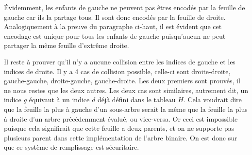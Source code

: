 \documentclass{article}
\begin{document}
Évidemment, les enfants de gauche ne peuvent pas êtres encodés par la feuille de gauche car ils la partage tous. Il sont donc encodés par la feuille de droite. Analogiquement à la preuve du paragraphe ci-haut, il est évident que cet encodage est unique pour tous les enfants de gauche puisqu'aucun ne peut partager la même feuille d'extrême droite.

Il reste à prouver qu'il n'y a aucune collision entre les indices de gauche et les indices de droite. Il y a 4 cas de collision possible, celle-ci sont droite-droite, gauche-gauche, droite-gauche, gauche-droite. Les deux premiers sont prouvés, il ne nous restes que les deux autres. Les deux cas sont similaires, autrement dit, un indice $g$ équivaut à un indice $d$ déjà défini dans le tableau $H$. Cela voudrait dire que la feuille la plus à gauche d'un sous-arbre serait la même que la feuille la plus à droite d'un arbre précédemment évalué, ou vice-versa. Or ceci est impossible puisque cela signifirait que cette feuille a deux parents, et on ne supporte pas plusieurs parent dans cette implémentation de l'arbre binaire. On est donc sur que ce système de remplissage est sécuritaire.
\end{document}
